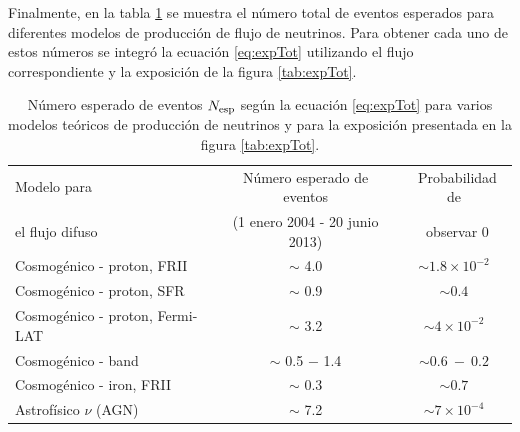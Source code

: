  	Finalmente, en la tabla \ref{tab:rates} se muestra el n\'umero total de eventos esperados para diferentes modelos de producci\'on de flujo de neutrinos.
 	Para obtener cada uno de estos n\'umeros se integr\'o la ecuaci\'on \ref{eq:expTot} utilizando el flujo correspondiente y la exposici\'on de la figura \ref{tab:expTot}.
	\begin{table}[!t]
	\begin{center}
	\renewcommand{\arraystretch}{1.3}
	\footnotesize
	\begin{tabular}{l c c} 
	\hline
	Modelo para       &  Número esperado de eventos     & ~Probabilidad de   \\
	el flujo difuso   &  (1 enero 2004 - 20 junio 2013) & ~observar $0$   \\
	\hline
	Cosmogénico - proton, FRII \cite{Kampert_GZK}     &  $\sim$ 4.0  & $\sim 1.8\times 10^{-2}$ \\

	Cosmogénico - proton, SFR \cite{Kampert_GZK}      &  $\sim$ 0.9  & $\sim 0.4$               \\

	Cosmogénico - proton, Fermi-LAT \cite{Ahlers_GZK} &  $\sim$ 3.2  & $\sim 4\times 10^{-2}$   \\

	Cosmogénico - band \cite{Kotera_GZK}              &  $\sim$ 0.5 $-$ 1.4 & $\sim 0.6~-~0.2$ \\

	Cosmogénico - iron, FRII \cite{Kampert_GZK}       &  $\sim$ 0.3  & $\sim 0.7$ \\

	\hline

	Astrofísico $\nu$ (AGN) \cite{Becker_AGN}     &  $\sim$ 7.2  & $\sim 7\times 10^{-4}$ \\

% 

	\hline
	\end{tabular}
	\end{center}
	\vskip -3mm
	\caption{\label{tab:rates}
	Número esperado de eventos $N_{\rm esp}$ según la ecuación \ref{eq:expTot} para varios modelos teóricos de producción de neutrinos y para la exposición presentada en la figura \ref{tab:expTot}.
	}
	\end{table}
	
